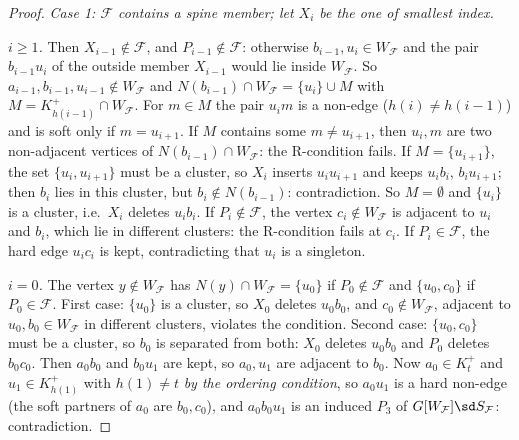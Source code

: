\begin{proof}
\emph{Case 1: $\mathcal F$ contains a spine member; let $X_i$ be the one of smallest index.}

\emph{$i\ge1$.} Then $X_{i-1}\notin\mathcal F$, and $P_{i-1}\notin\mathcal F$: otherwise $b_{i-1},u_i\in W_{\mathcal F}$ and the pair $b_{i-1}u_i$ of the outside member $X_{i-1}$ would lie inside $W_{\mathcal F}$. So $a_{i-1},b_{i-1},u_{i-1}\notin W_{\mathcal F}$ and $N(b_{i-1})\cap W_{\mathcal F}=\{u_i\}\cup M$ with $M=K^+_{h(i-1)}\cap W_{\mathcal F}$. For $m\in M$ the pair $u_im$ is a non-edge ($h(i)\ne h(i-1)$) and is soft only if $m=u_{i+1}$. If $M$ contains some $m\ne u_{i+1}$, then $u_i,m$ are two non-adjacent vertices of $N(b_{i-1})\cap W_{\mathcal F}$: the R-condition fails. If $M=\{u_{i+1}\}$, the set $\{u_i,u_{i+1}\}$ must be a cluster, so $X_i$ inserts $u_iu_{i+1}$ and keeps $u_ib_i$, $b_iu_{i+1}$; then $b_i$ lies in this cluster, but $b_i\notin N(b_{i-1})$: contradiction. So $M=\emptyset$ and $\{u_i\}$ is a cluster, i.e.\ $X_i$ deletes $u_ib_i$. If $P_i\notin\mathcal F$, the vertex $c_i\notin W_{\mathcal F}$ is adjacent to $u_i$ and $b_i$, which lie in different clusters: the R-condition fails at $c_i$. If $P_i\in\mathcal F$, the hard edge $u_ic_i$ is kept, contradicting that $u_i$ is a singleton.

\emph{$i=0$.} The vertex $y\notin W_{\mathcal F}$ has $N(y)\cap W_{\mathcal F}=\{u_0\}$ if $P_0\notin\mathcal F$ and $\{u_0,c_0\}$ if $P_0\in\mathcal F$. First case: $\{u_0\}$ is a cluster, so $X_0$ deletes $u_0b_0$, and $c_0\notin W_{\mathcal F}$, adjacent to $u_0,b_0\in W_{\mathcal F}$ in different clusters, violates the condition. Second case: $\{u_0,c_0\}$ must be a cluster, so $b_0$ is separated from both: $X_0$ deletes $u_0b_0$ and $P_0$ deletes $b_0c_0$. Then $a_0b_0$ and $b_0u_1$ are kept, so $a_0,u_1$ are adjacent to $b_0$. Now $a_0\in K_t^+$ and $u_1\in K^+_{h(1)}$ with $h(1)\ne t$ \emph{by the ordering condition}, so $a_0u_1$ is a hard non-edge (the soft partners of $a_0$ are $b_0,c_0$), and $a_0b_0u_1$ is an induced $P_3$ of $G[W_{\mathcal F}]\sd S_{\mathcal F}$: contradiction.


\end{proof}
